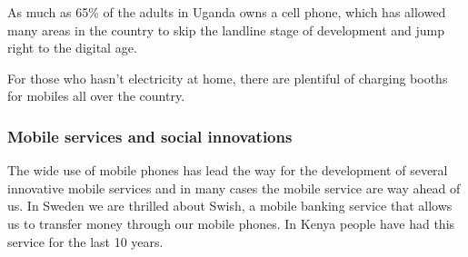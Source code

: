     As much as 65\% of the adults in Uganda owns a cell phone, which has allowed many areas in the country to skip the landline stage of development and jump right to the digital age.

    For those who hasn’t electricity at home, there are plentiful of charging booths for mobiles all over the country.

    \subsubsection{Mobile services and social innovations}
    The wide use of mobile phones has lead the way for the development of several innovative mobile services and in many cases the mobile service are way ahead of us. In Sweden we are thrilled about Swish, a mobile banking service that allows us to transfer money through our mobile phones. In Kenya people have had this service for the last 10 years.
